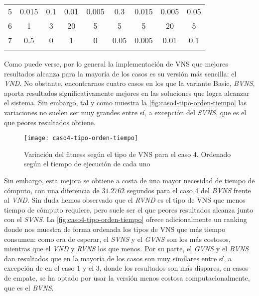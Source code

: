 \begin{table}[h]
{\begin{tabular}{lcccccccc}
			5         &        0.015         &         0.1          &         0.01         &        0.005         &         0.3          &        0.015         &        0.005         &         0.05         \\
			6         &          1           &          3           &          20          &          5           &          5           &          5           &          20          &          5           \\
			7         &         0.5          &          0           &          1           &          0           &         0.05         &        0.005         &         0.01         &         0.1          \\ \hline
			          & \multicolumn{1}{l}{} & \multicolumn{1}{l}{} & \multicolumn{1}{l}{} & \multicolumn{1}{l}{} & \multicolumn{1}{l}{} & \multicolumn{1}{l}{} & \multicolumn{1}{l}{} & \multicolumn{1}{l}{}
		\end{tabular}%
	}
\end{table}

Como puede verse, por lo general la implementación de VNS que mejores resultados alcanza para la mayoría de los casos es su versión más sencilla: el \textit{VND}. No obstante, encontrarnos cuatro casos en los que la variante Basic, \textit{BVNS}, aporta resultados significativamente mejores en las soluciones que logra alcanzar el sistema. Sin embargo, tal y como muestra la \autoref{fig:caso4-tipo-orden-tiempo} las variaciones no suelen ser muy grandes entre sí, a excepción del \textit{SVNS}, que es el que peores resultados obtiene.

\begin{figure}[h]
	\centering
	\texttt{[image: caso4-tipo-orden-tiempo]}
	\caption{Variación del fitness según el tipo de VNS para el caso 4. Ordenado según el tiempo de ejecución de cada uno}
	\label{fig:caso4-tipo-orden-tiempo}
\end{figure}

Sin embargo, esta mejora se obtiene a costa de una mayor necesidad de tiempo de cómputo, con una diferencia de $31.2762$ segundos para el caso 4 del \textit{BVNS} frente al \textit{VND}. Sin duda hemos observado que el \textit{RVND} es el tipo de VNS que menos tiempo de cómputo requiere, pero suele ser el que peores resultados alcanza junto con el \textit{SVNS}. La \autoref{fig:caso4-tipo-orden-tiempo} ofrece adicionalmente un ranking donde nos muestra de forma ordenada los tipos de VNS que más tiempo consumen: como era de esperar, el \textit{SVNS} y el \textit{GVNS} son los más costosos, mientras que el \textit{VND} y \textit{RVNS} los que menos. Por su parte, el \textit{GVNS} y el \textit{BVNS} dan resultados que en la mayoría de los casos son muy similares entre sí, a excepción de en el caso 1 y el 3, donde los resultados son más dispares, en casos de empate, se ha optado por usar la versión menos costosa computacionalmente, que es el \textit{BVNS}.

